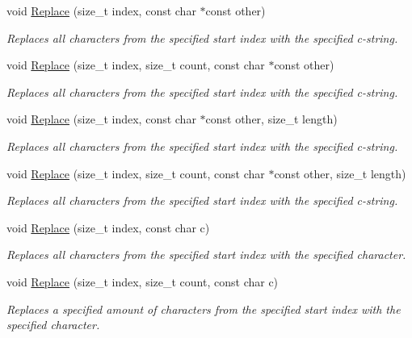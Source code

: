 \begin{DoxyCompactItemize}
void \hyperlink{class_power_1_1_string_a662ac2de658f0129ba3e20bbb8841c06}{Replace} (size\+\_\+t index, const char $\ast$const other)
\begin{DoxyCompactList}\small\item\em Replaces all characters from the specified start index with the specified c-\/string. \end{DoxyCompactList}\item 
void \hyperlink{class_power_1_1_string_acbe6e2e31229075c99d1e498a02c8128}{Replace} (size\+\_\+t index, size\+\_\+t count, const char $\ast$const other)
\begin{DoxyCompactList}\small\item\em Replaces all characters from the specified start index with the specified c-\/string. \end{DoxyCompactList}\item 
void \hyperlink{class_power_1_1_string_a7df46dbd4f708f9c758f4b29f77ff1b5}{Replace} (size\+\_\+t index, const char $\ast$const other, size\+\_\+t length)
\begin{DoxyCompactList}\small\item\em Replaces all characters from the specified start index with the specified c-\/string. \end{DoxyCompactList}\item 
void \hyperlink{class_power_1_1_string_a7cb1da79b5e33beb3591a554145aad32}{Replace} (size\+\_\+t index, size\+\_\+t count, const char $\ast$const other, size\+\_\+t length)
\begin{DoxyCompactList}\small\item\em Replaces all characters from the specified start index with the specified c-\/string. \end{DoxyCompactList}\item 
void \hyperlink{class_power_1_1_string_aaa587a207643c7dbb401574651b42ff2}{Replace} (size\+\_\+t index, const char c)
\begin{DoxyCompactList}\small\item\em Replaces all characters from the specified start index with the specified character. \end{DoxyCompactList}\item 
void \hyperlink{class_power_1_1_string_ac577d7badcecee8bf6f55bd7150bbb4b}{Replace} (size\+\_\+t index, size\+\_\+t count, const char c)
\begin{DoxyCompactList}\small\item\em Replaces a specified amount of characters from the specified start index with the specified character. \end{DoxyCompactList}\item 

\end{DoxyCompactItemize}
